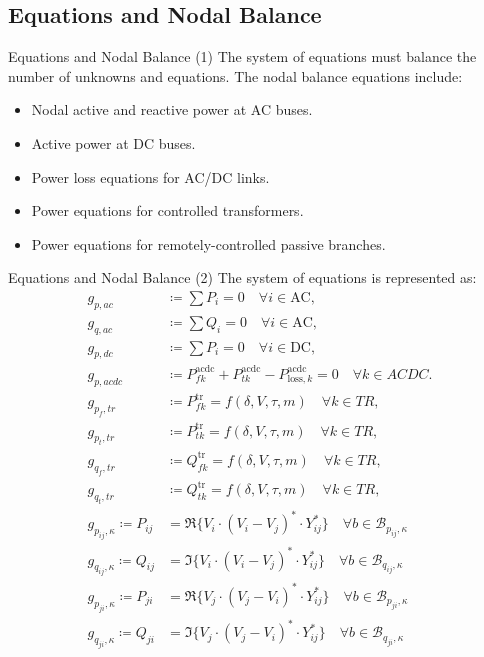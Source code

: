 \subsection{Equations and Nodal Balance}
\begin{frame}{Equations and Nodal Balance (1)}
    The system of equations must balance the number of unknowns and equations. The nodal balance equations include:
    \begin{itemize}
        \item Nodal active and reactive power at AC buses.
        \item Active power at DC buses.
        \item Power loss equations for AC/DC links.
        \item Power equations for controlled transformers.
        \item Power equations for remotely-controlled passive branches.
    \end{itemize}
\end{frame}
\begin{frame}{Equations and Nodal Balance (2)}
    The system of equations is represented as:
    \begin{align*}
        g_{p,ac} &\coloneqq \sum P_i = 0 \quad \forall i \in \text{AC}, \\
        g_{q,ac} &\coloneqq \sum Q_i = 0 \quad \forall i \in \text{AC}, \\
        g_{p,dc} &\coloneqq \sum P_i = 0 \quad \forall i \in \text{DC}, \\
        g_{p,acdc} &\coloneqq P_{fk}^\text{acdc} + P_{tk}^\text{acdc} - P_{\text{loss},k}^\text{acdc} = 0 \quad \forall k \in ACDC. \\
        g_{p_f,tr} &\coloneqq P_{fk}^\text{tr} = f(\delta, V, \tau, m) \quad \forall k \in TR, \\
        g_{p_t,tr} &\coloneqq P_{tk}^\text{tr} = f(\delta, V, \tau, m) \quad \forall k \in TR, \\
        g_{q_f,tr} &\coloneqq Q_{fk}^\text{tr} = f(\delta, V, \tau, m) \quad \forall k \in TR, \\
        g_{q_t,tr} &\coloneqq Q_{tk}^\text{tr} = f(\delta, V, \tau, m) \quad \forall k \in TR, \\
        g_{p_{ij}, \kappa } \coloneqq P_{ij} &= \Re \{ V_i \cdot (V_i - V_j)^* \cdot Y^*_{ij} \} \quad \forall b \in \mathcal{B}_{p_{ij}, \kappa} \\
        g_{q_{ij}, \kappa } \coloneqq Q_{ij} &= \Im \{ V_i \cdot (V_i - V_j)^* \cdot Y^*_{ij} \} \quad \forall b \in \mathcal{B}_{q_{ij}, \kappa} \\
        g_{p_{ji}, \kappa } \coloneqq P_{ji} &= \Re \{ V_j \cdot (V_j - V_i)^* \cdot Y^*_{ij} \} \quad \forall b \in \mathcal{B}_{p_{ji}, \kappa} \\
        g_{q_{ji}, \kappa } \coloneqq Q_{ji} &= \Im \{ V_j \cdot (V_j - V_i)^* \cdot Y^*_{ij} \} \quad \forall b \in \mathcal{B}_{q_{ji}, \kappa}
    \end{align*}
\end{frame}

